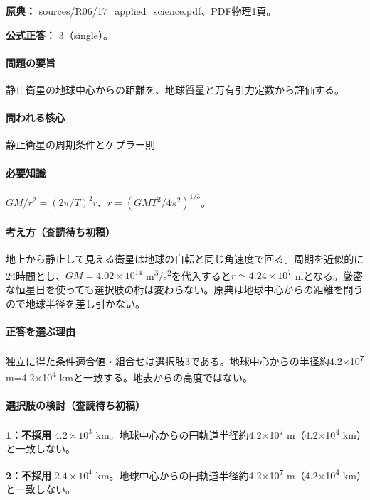 \noindent\textbf{原典：} sources/R06/17\_applied\_science.pdf、PDF物理1頁。

\textbf{公式正答：} 3（single）。

\paragraph{問題の要旨} 静止衛星の地球中心からの距離を、地球質量と万有引力定数から評価する。

\paragraph{問われる核心} 静止衛星の周期条件とケプラー則

\paragraph{必要知識} \(GM/r^2=(2\pi/T)^2r\)、\(r=(GMT^2/4\pi^2)^{1/3}\)。

\paragraph{考え方（査読待ち初稿）} 地上から静止して見える衛星は地球の自転と同じ角速度で回る。周期を近似的に24時間とし、\(GM=4.02\times10^{14}\) m\textsuperscript{3}/s\textsuperscript{2}を代入すると\(r\simeq4.24\times10^7\) mとなる。厳密な恒星日を使っても選択肢の桁は変わらない。原典は地球中心からの距離を問うので地球半径を差し引かない。

\paragraph{正答を選ぶ理由} 独立に得た条件適合値・組合せは選択肢3である。地球中心からの半径約4.2×10\textsuperscript{7} m=\allowbreak{}4.2×10\textsuperscript{4} kmと一致する。地表からの高度ではない。

\paragraph{選択肢の検討（査読待ち初稿）}\mbox{}\par

\noindent\textbf{1：不採用} \(4.2\times10^3\) km。地球中心からの円軌道半径約4.2×10\textsuperscript{7} m（4.2×10\textsuperscript{4} km）と一致しない。\par

\noindent\textbf{2：不採用} \(2.4\times10^4\) km。地球中心からの円軌道半径約4.2×10\textsuperscript{7} m（4.2×10\textsuperscript{4} km）と一致しない。\par


